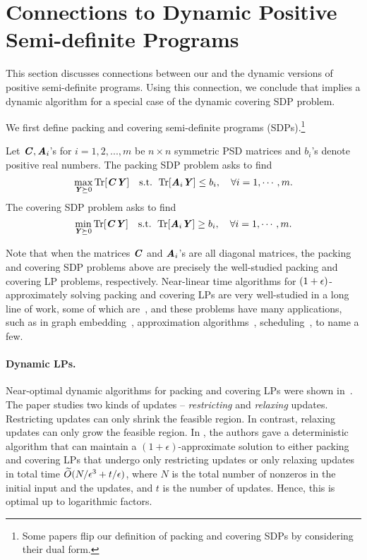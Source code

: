 \section{Connections to Dynamic Positive Semi-definite Programs}
\label{sec:dyn psd}
This section discusses connections between our  and the dynamic versions of positive semi-definite programs. Using this connection, we conclude that  implies a dynamic algorithm for a special case of the dynamic covering SDP problem. 

We first define packing and covering semi-definite programs (SDPs).\footnote{Some papers \cite{jambulapati2021positive} flip our definition of packing and covering SDPs by considering their dual form.}


\begin{definition} Let $\CC, \AA_i$'s for $i = 1,2,...,m$ be $n\times n$ symmetric PSD matrices and $b_i$'s denote positive real numbers. The packing SDP problem asks to find
\[
\max_{\YY\succeq 0} \Tr[\CC\YY]  \quad \text{s.t.  } \Tr[\AA_i\YY]\leq b_i, \quad\forall i = 1,\cdots, m.
\]
The covering SDP problem asks to find
\[
\min_{\YY\succeq 0} \Tr[\CC\YY]  \quad \text{s.t.  } \Tr[\AA_i\YY]\geq b_i, \quad\forall i = 1,\cdots, m.
\]
\end{definition}
Note that when the matrices $\CC$ and $\AA_i$'s are all diagonal matrices, the packing and covering SDP problems above are precisely the well-studied packing and covering LP problems, respectively. Near-linear time algorithms for $(1+\eps)$-approximately solving packing and covering LPs are very well-studied in a long line of work, some of which are~\cite{allen2015nearly,allen2019nearly,wang2016unified,quanrud2020nearly}, and these problems have many applications, such as in graph embedding~\cite{plotkin1995fast}, approximation algorithms~\cite{luby1993parallel,trevisan1998parallel}, scheduling~\cite{plotkin1995fast}, to name a few.

\paragraph{Dynamic LPs.}
Near-optimal dynamic algorithms for packing and covering LPs were shown in~\cite{bhattacharya2023dynamic}. The paper studies two kinds of updates -- {\it restricting} and {\it relaxing} updates.
Restricting updates can only shrink the feasible region. In contrast, relaxing updates can only grow the feasible region.
In \cite{bhattacharya2023dynamic}, the authors gave a deterministic algorithm that can maintain a $(1+\epsilon)$-approximate solution to either packing and covering LPs that undergo only restricting updates or only relaxing updates in total time $\Otil(N/\epsilon^3 + t/\epsilon)$, where $N$ is the total number of nonzeros in the initial input and the updates, and $t$ is the number of updates. Hence, this is optimal up to logarithmic factors. 

